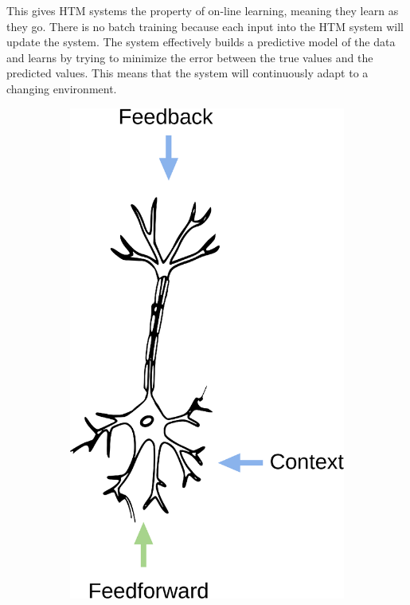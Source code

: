 This gives HTM systems the property of on-line learning, meaning they learn as they go. There is no batch training because each input into the HTM system will update the system. The system effectively builds a predictive model of the data and learns by trying to minimize the error between the true values and the predicted values. This means that the system will continuously adapt to a changing environment.
\begin{figure}[H]
    \centering
    \begin{subfigure}[b]{0.35\linewidth}
        \centering
        \hspace*{1cm}
        \includegraphics[width=\linewidth]{resources/related_works/neuron_biological}

\end{subfigure}
\end{figure}
